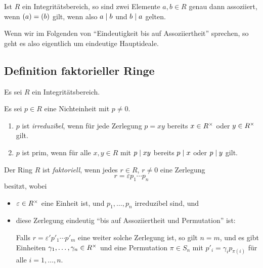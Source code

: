 \begin{lemma}
  Ist $R$ ein Integritätsbereich, so sind zwei Elemente $a, b \in R$ genau dann assoziiert, wenn $(a) = (b)$ gilt, wenn also $a \mathrel{|} b$ und $b \mathrel{|} a$ gelten.
\end{lemma}

Wenn wir im Folgenden von \enquote{Eindeutigkeit bis auf Assoziiertheit} sprechen, so geht es also eigentlich um eindeutige Hauptideale.



\subsection{Definition faktorieller Ringe}

Es sei $R$ ein Integritätsbereich.

\begin{definition}
  Es sei $p \in R$ eine Nichteinheit mit $p \neq 0$.
  \begin{enumerate}
    \item
      $p$ ist \emph{irreduzibel}, wenn für jede Zerlegung $p = xy$ bereits $x \in R^{\times}$ oder $y \in R^{\times}$ gilt.
    \item
       $p$ ist prim, wenn für alle $x, y \in R$ mit $p \mathrel{|} xy$ bereits $p \mathrel{|} x$ oder $p \mathrel{|} y$ gilt.
  \end{enumerate}
\end{definition}

\begin{definition}
\label{definition: ufd}
  Der Ring $R$ ist \emph{faktoriell}, wenn jedes $r \in R$, $r \neq 0$ eine Zerlegung
  \begin{equation}
  \label{equation: decomposition into irreducibles}
    r = \varepsilon p_1 \dotsm p_n
  \end{equation}
  besitzt, wobei
  \begin{itemize}
    \item
      $\varepsilon \in R^{\times}$ eine Einheit ist, und $p_1, \dotsc, p_n$ irreduzibel sind, und
    \item
      diese Zerlegung eindeutig \enquote{bis auf Assoziiertheit und Permutation} ist:
      
      Falls $r = \varepsilon' p'_1 \dotsm p'_m$ eine weiter solche Zerlegung ist, so gilt $n = m$, und es gibt Einheiten $\gamma_1, \dotsc, \gamma_n \in R^{\times}$ und eine Permutation $\pi \in S_n$ mit $p'_i = \gamma_i p_{\pi(i)}$ für alle $i = 1, \dotsc, n$.
  \end{itemize}
\end{definition}

